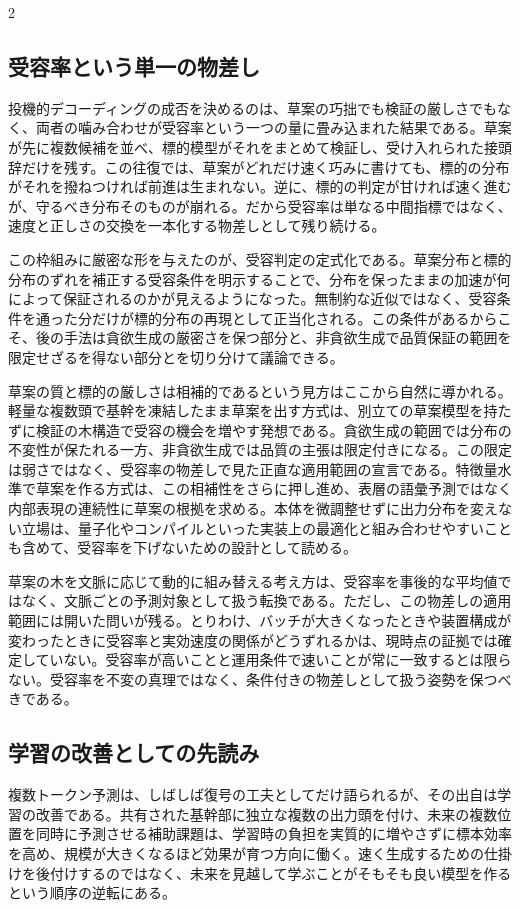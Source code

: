 \documentclass[lualatex,a4paper,10pt]{jlreq}
\begin{document}
\begin{multicols}{2}
\subsection{受容率という単一の物差し}
投機的デコーディングの成否を決めるのは、草案の巧拙でも検証の厳しさでもなく、両者の噛み合わせが受容率という一つの量に畳み込まれた結果である。草案が先に複数候補を並べ、標的模型がそれをまとめて検証し、受け入れられた接頭辞だけを残す。この往復では、草案がどれだけ速く巧みに書けても、標的の分布がそれを撥ねつければ前進は生まれない。逆に、標的の判定が甘ければ速く進むが、守るべき分布そのものが崩れる。だから受容率は単なる中間指標ではなく、速度と正しさの交換を一本化する物差しとして残り続ける\autocite{specdecode}。

この枠組みに厳密な形を与えたのが、受容判定の定式化である。草案分布と標的分布のずれを補正する受容条件を明示することで、分布を保ったままの加速が何によって保証されるのかが見えるようになった\autocite{chenspec}。無制約な近似ではなく、受容条件を通った分だけが標的分布の再現として正当化される。この条件があるからこそ、後の手法は貪欲生成の厳密さを保つ部分と、非貪欲生成で品質保証の範囲を限定せざるを得ない部分とを切り分けて議論できる。

草案の質と標的の厳しさは相補的であるという見方はここから自然に導かれる。軽量な複数頭で基幹を凍結したまま草案を出す方式は、別立ての草案模型を持たずに検証の木構造で受容の機会を増やす発想である\autocite{medusa}。貪欲生成の範囲では分布の不変性が保たれる一方、非貪欲生成では品質の主張は限定付きになる。この限定は弱さではなく、受容率の物差しで見た正直な適用範囲の宣言である。特徴量水準で草案を作る方式は、この相補性をさらに押し進め、表層の語彙予測ではなく内部表現の連続性に草案の根拠を求める。本体を微調整せずに出力分布を変えない立場は、量子化やコンパイルといった実装上の最適化と組み合わせやすいことも含めて、受容率を下げないための設計として読める\autocite{eagle}。

草案の木を文脈に応じて動的に組み替える考え方は、受容率を事後的な平均値ではなく、文脈ごとの予測対象として扱う転換である\autocite{eagle2}。ただし、この物差しの適用範囲には開いた問いが残る。とりわけ、バッチが大きくなったときや装置構成が変わったときに受容率と実効速度の関係がどうずれるかは、現時点の証拠では確定していない。受容率が高いことと運用条件で速いことが常に一致するとは限らない。受容率を不変の真理ではなく、条件付きの物差しとして扱う姿勢を保つべきである。

\subsection{学習の改善としての先読み}
複数トークン予測は、しばしば復号の工夫としてだけ語られるが、その出自は学習の改善である。共有された基幹部に独立な複数の出力頭を付け、未来の複数位置を同時に予測させる補助課題は、学習時の負担を実質的に増やさずに標本効率を高め、規模が大きくなるほど効果が育つ方向に働く\autocite{mtp}。速く生成するための仕掛けを後付けするのではなく、未来を見越して学ぶことがそもそも良い模型を作るという順序の逆転にある。


\end{multicols}
\end{document}
